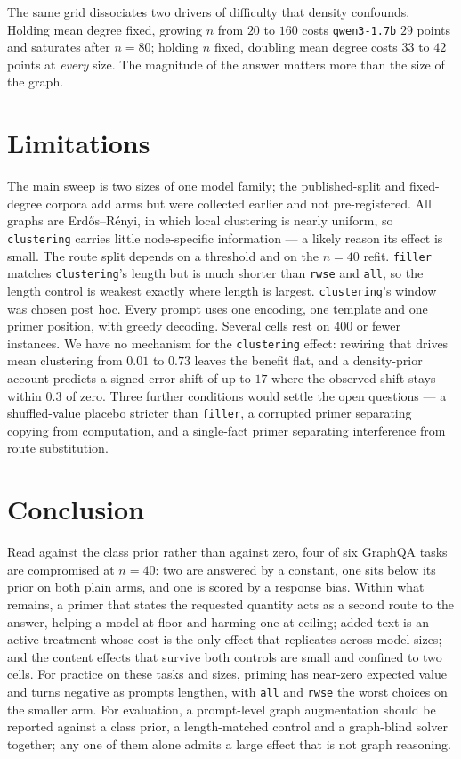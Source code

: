\documentclass[11pt]{article}
\begin{document}
The same grid dissociates two drivers of difficulty that density confounds.
Holding mean degree fixed, growing $n$ from $20$ to $160$ costs
\texttt{qwen3-1.7b} $29$ points and saturates after $n{=}80$; holding $n$
fixed, doubling mean degree costs $33$ to $42$ points at \emph{every} size. The
magnitude of the answer matters more than the size of the graph.

\section*{Limitations}

The main sweep is two sizes of one model family; the published-split and
fixed-degree corpora add arms but were collected earlier and not
pre-registered. All graphs are Erd\H{o}s--R\'enyi, in which local clustering is
nearly uniform, so \texttt{clustering} carries little node-specific
information --- a likely reason its effect is small. The route split depends on
a threshold and on the $n{=}40$ refit. \texttt{filler} matches
\texttt{clustering}'s length but is much shorter than \texttt{rwse} and
\texttt{all}, so the length control is weakest exactly where length is largest.
\texttt{clustering}'s window was chosen post hoc. Every prompt uses one
encoding, one template and one primer position, with greedy decoding. Several
cells rest on $400$ or fewer instances. We have no mechanism for the
\texttt{clustering} effect: rewiring that drives mean clustering from $0.01$ to
$0.73$ leaves the benefit flat, and a density-prior account predicts a signed
error shift of up to $17$ where the observed shift stays within $0.3$ of zero.
Three further conditions would settle the open questions --- a shuffled-value
placebo stricter than \texttt{filler}, a corrupted primer separating copying
from computation, and a single-fact primer separating interference from route
substitution.

\section*{Conclusion}

Read against the class prior rather than against zero, four of six GraphQA
tasks are compromised at $n{=}40$: two are answered by a constant, one sits
below its prior on both plain arms, and one is scored by a response bias.
Within what remains, a primer that states the requested quantity acts as a
second route to the answer, helping a model at floor and harming one at
ceiling; added text is an active treatment whose cost is the only effect that
replicates across model sizes; and the content effects that survive both
controls are small and confined to two cells. For practice on these tasks and
sizes, priming has near-zero expected value and turns negative as prompts
lengthen, with \texttt{all} and \texttt{rwse} the worst choices on the smaller
arm. For evaluation, a prompt-level graph augmentation should be reported
against a class prior, a length-matched control and a graph-blind solver
together; any one of them alone admits a large effect that is not graph
reasoning.
\end{document}
